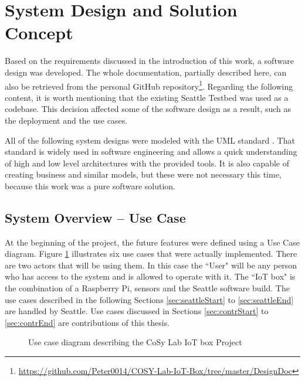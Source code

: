 \documentclass{article}      %
\begin{document}
\section{System Design and Solution Concept} \label{sec:systemDesign}

Based on the requirements discussed in the introduction of this work, a software design was developed. The whole documentation, partially described here, can also be retrieved from the personal GitHub repository\footnote{ \url{https://github.com/Peter0014/COSY-Lab-IoT-Box/tree/master/DesignDoc}}. Regarding the following content, it is worth mentioning that the existing Seattle Testbed \cite{seattleHomepage} was used as a codebase. This decision affected some of the software design as a result, such as the deployment and the use cases.

All of the following system designs were modeled with the \gls{UML} standard \cite{uml}. That standard is widely used in software engineering and allows a quick understanding of high and low level architectures with the provided tools. It is also capable of creating business and similar models, but these were not necessary this time, because this work was a pure software solution.

\subsection{System Overview -- Use Case}

At the beginning of the project, the future features were defined using a Use Case diagram. Figure \ref{fig:useCase} illustrates six use cases that were actually implemented. There are two actors that will be using them. In this case the ``User" will be any person who has access to the system and is allowed to operate with it. The ``\gls{IoT} box" is the combination of a Raspberry Pi, sensors and the Seattle software build. The use cases described in the following Sections \ref{sec:seattleStart} to \ref{sec:seattleEnd} are handled by Seattle. Use cases discussed in Sections \ref{sec:contrStart} to \ref{sec:contrEnd} are contributions of this thesis.

\begin{figure}[ht]
	\caption{Use case diagram describing the \gls{CoSy} Lab \gls{IoT} box Project}
	\label{fig:useCase}
\end{figure}
\end{document}
